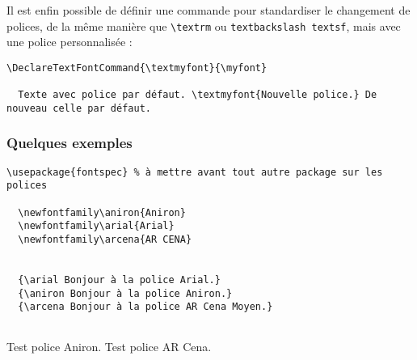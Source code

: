 Il est enfin possible de définir une commande pour standardiser le changement de polices, de la même manière que \texttt{\textbackslash textrm} ou \texttt{textbackslash textsf},  mais avec une police personnalisée :

\begin{lstlisting}[language={[LaTeX]TeX}]
  \DeclareTextFontCommand{\textmyfont}{\myfont}

  Texte avec police par défaut. \textmyfont{Nouvelle police.} De nouveau celle par défaut.
\end{lstlisting}

\subsubsection{Quelques exemples}
\begin{minipage}{.6\textwidth}
\begin{lstlisting}[language={[LaTeX]TeX}]
  \usepackage{fontspec} % à mettre avant tout autre package sur les polices
  
  \newfontfamily\aniron{Aniron}
  \newfontfamily\arial{Arial}
  \newfontfamily\arcena{AR CENA}

  
  {\arial Bonjour à la police Arial.}
  {\aniron Bonjour à la police Aniron.}
  {\arcena Bonjour à la police AR Cena Moyen.}
  
\end{lstlisting}
\end{minipage}
\hfill%
\begin{minipage}{.35\textwidth}
\newline
{\aniron Test police Aniron.}
\newline
{\arcena Test police AR Cena.}
\end{minipage}
\hfill\rule{0pt}{0pt}


